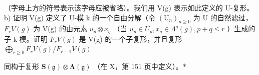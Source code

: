 （字母上方的符号表示该字母应被省略）。我们用 V(g) 表示如此定义的 U-复形。b) 证明 V(g) 定义了 U-模 k 的一个自由分解（令 \((\mathrm{U}_{n})_{n\geqslant0}\) 为 U 的自然滤过， \(F_{r}V(g)\) 为 V(g) 的由元素 \(u_{p}\otimes x_{q}\) （当 \(u_{p}\in U_{p}, x_{q}\in\Lambda^{q}(g), p+q\leqslant r\) ）生成的子 k-模。证明 \(F_{r}V(g)\) 是 V(g) 的一个子复形，并且复形 \(\bigoplus_{r\geqslant0}F_{r}V(g)/F_{r-1}V(g)\)

同构于复形 \(\mathbf{S}(\mathfrak{g})\otimes\symbf{\Lambda}(\mathfrak{g})\) （在 X，第 151 页中定义）。*
\relax{}
